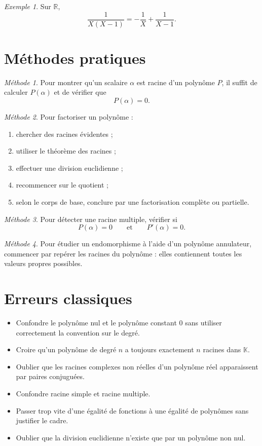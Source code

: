 \documentclass[11pt,a4paper]{article}
\theoremstyle{remark}
\newtheorem{exemple}[definition]{Exemple}
\newtheorem*{methode}{Méthode}
\newcommand{\R}{\mathbb{R}}
\newcommand{\K}{\mathbb{K}}
\begin{document}
\begin{exemple}
Sur \(\R\),
\[
\frac{1}{X(X-1)}=-\frac{1}{X}+\frac{1}{X-1}.
\]
\end{exemple}

\section{Méthodes pratiques}

\begin{methode}
Pour montrer qu’un scalaire \(\alpha\) est racine d’un polynôme \(P\), il suffit de calculer \(P(\alpha)\) et de vérifier que
\[
P(\alpha)=0.
\]
\end{methode}

\begin{methode}
Pour factoriser un polynôme :
\begin{enumerate}
    \item chercher des racines évidentes ;
    \item utiliser le théorème des racines ;
    \item effectuer une division euclidienne ;
    \item recommencer sur le quotient ;
    \item selon le corps de base, conclure par une factorisation complète ou partielle.
\end{enumerate}
\end{methode}

\begin{methode}
Pour détecter une racine multiple, vérifier si
\[
P(\alpha)=0
\qquad \text{et} \qquad
P'(\alpha)=0.
\]
\end{methode}

\begin{methode}
Pour étudier un endomorphisme à l’aide d’un polynôme annulateur, commencer par repérer les racines du polynôme : elles contiennent toutes les valeurs propres possibles.
\end{methode}

\section{Erreurs classiques}

\begin{itemize}
    \item Confondre le polynôme nul et le polynôme constant \(0\) sans utiliser correctement la convention sur le degré.
    \item Croire qu’un polynôme de degré \(n\) a toujours exactement \(n\) racines dans \(\K\).
    \item Oublier que les racines complexes non réelles d’un polynôme réel apparaissent par paires conjuguées.
    \item Confondre racine simple et racine multiple.
    \item Passer trop vite d’une égalité de fonctions à une égalité de polynômes sans justifier le cadre.
    \item Oublier que la division euclidienne n’existe que par un polynôme non nul.
\end{itemize}
\end{document}
